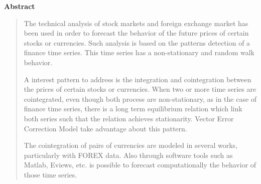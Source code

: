 \vspace*{2cm}
\thispagestyle{empty}
{\bfseries \Huge Abstract }
\vspace{1.5cm}

\begin{quotation}
The technical analysis of stock markets and foreign exchange market has been
used in order to forecast the behavior of the future prices of certain stocks
or currencies. Such analysis is based on the patterns detection of a finance
time series. This time series has a non-stationary and random walk behavior.


A interest pattern to address is the integration and cointegration between
the prices of certain stocks or currencies. When two or more time series are
cointegrated, even though both process are non-stationary, as in the case
of finance time series, there is a long term equilibrium relation which link
both series such that the relation achieves stationarity. Vector Error
Correction Model take advantage about this pattern.


The cointegration of pairs of currencies are modeled in several works, particularly
with FOREX data. Also through software tools such as Matlab, Eviews, etc. is possible
to forecast computationally the behavior of those time series.



\end{quotation}
